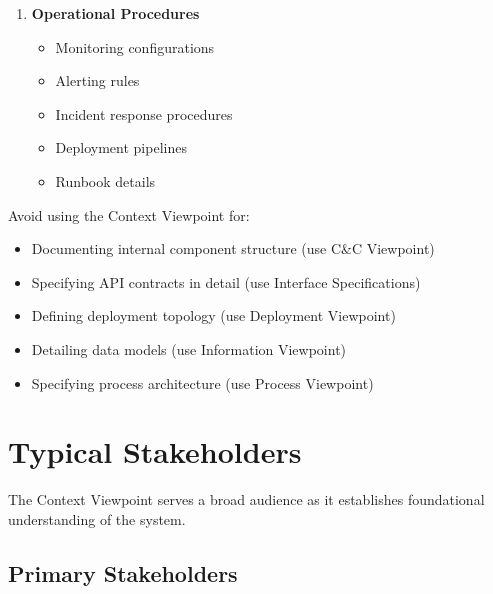\documentclass[11pt,letterpaper]{article}
\begin{document}
\begin{enumerate}[label=\textbf{AC\arabic*:}, leftmargin=2.5em]
    \item \textbf{Operational Procedures}
    \begin{itemize}[nosep]
        \item Monitoring configurations
        \item Alerting rules
        \item Incident response procedures
        \item Deployment pipelines
        \item Runbook details
    \end{itemize}
\end{enumerate}

\begin{warningbox}
Avoid using the Context Viewpoint for:

\begin{itemize}[nosep]
    \item Documenting internal component structure (use C\&C Viewpoint)
    \item Specifying API contracts in detail (use Interface Specifications)
    \item Defining deployment topology (use Deployment Viewpoint)
    \item Detailing data models (use Information Viewpoint)
    \item Specifying process architecture (use Process Viewpoint)
\end{itemize}
\end{warningbox}

\section{Typical Stakeholders}

The Context Viewpoint serves a broad audience as it establishes foundational understanding of the system.

\subsection{Primary Stakeholders}
\end{document}
